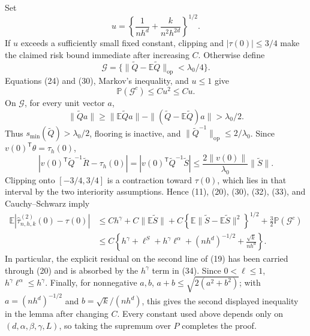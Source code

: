 Set
\[
 u=\left\{\frac1{nh^d}+\frac{k}{n^2h^{2d}}\right\}^{1/2}.
 \tag{31}
\]
If \(u\) exceeds a sufficiently small fixed constant, clipping and \(|\tau(0)|\leq3/4\) make the claimed risk bound immediate after increasing \(C\).  Otherwise define
\[
 \mathcal G=\{\|\widetilde Q-\mathbb E\widetilde Q\|_{\mathrm{op}}<\lambda_0/4\}.
\]
Equations (24) and (30), Markov's inequality, and \(u\leq1\) give
\[
 \mathbb P(\mathcal G^c)\leq Cu^2\leq Cu.
 \tag{32}
\]
On \(\mathcal G\), for every unit vector \(a\),
\[
 \|\widetilde Qa\|
 \geq\|\mathbb E\widetilde Qa\|-\|(\widetilde Q-\mathbb E\widetilde Q)a\|
 >\lambda_0/2.
\]
Thus \(s_{\min}(\widetilde Q)>\lambda_0/2\), flooring is inactive, and \(\|\widetilde Q^{-1}\|_{\mathrm{op}}\leq2/\lambda_0\).  Since \(v(0)^{\mathsf T}\theta=\tau_h(0)\),
\[
 \left|v(0)^{\mathsf T}\widetilde Q^{-1}\widetilde R-\tau_h(0)\right|
 =\left|v(0)^{\mathsf T}\widetilde Q^{-1}\widetilde S\right|
 \leq\frac{2\|v(0)\|}{\lambda_0}\|\widetilde S\|.
 \tag{33}
\]
Clipping onto \([-3/4,3/4]\) is a contraction toward \(\tau(0)\), which lies in that interval by the two interiority assumptions.  Hence (11), (20), (30), (32), (33), and Cauchy--Schwarz imply
\[
 \begin{split}
 \mathbb E\left|\widehat\tau^{(2)}_{n,h,k}(0)-\tau(0)\right|
 &\leq Ch^\gamma+C\|\mathbb E\widetilde S\|
 +C\left\{\mathbb E\|\widetilde S-\mathbb E\widetilde S\|^2\right\}^{1/2}
 +\frac32\mathbb P(\mathcal G^c)\\
 &\leq C\left\{h^\gamma+\ell^S+h^\gamma\ell^\alpha
 +(nh^d)^{-1/2}+\frac{\sqrt{k}}{nh^d}\right\}.
 \end{split}
 \tag{34}
\]
In particular, the explicit residual on the second line of (19) has been carried through (20) and is absorbed by the \(h^\gamma\) term in (34).  Since \(0<\ell\leq1\), \(h^\gamma\ell^\alpha\leq h^\gamma\).  Finally, for nonnegative \(a,b\), \(a+b\leq\sqrt{2(a^2+b^2)}\); with \(a=(nh^d)^{-1/2}\) and \(b=\sqrt{k}/(nh^d)\), this gives the second displayed inequality in the lemma after changing \(C\).  Every constant used above depends only on \((d,\alpha,\beta,\gamma,L)\), so taking the supremum over \(P\) completes the proof.
